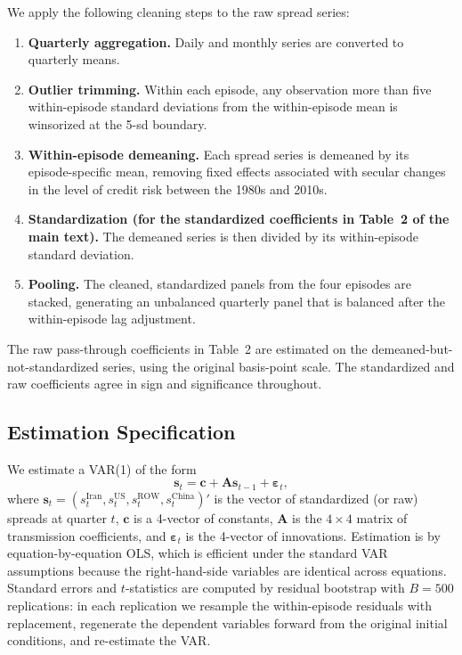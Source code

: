 \documentclass[12pt]{article}
\begin{document}
We apply the following cleaning steps to the raw spread series:
\begin{enumerate}[itemsep=2pt, topsep=2pt]
    \item \textbf{Quarterly aggregation.} Daily and monthly series are converted to quarterly means.
    \item \textbf{Outlier trimming.} Within each episode, any observation more than five within-episode standard deviations from the within-episode mean is winsorized at the 5-sd boundary.
    \item \textbf{Within-episode demeaning.} Each spread series is demeaned by its episode-specific mean, removing fixed effects associated with secular changes in the level of credit risk between the 1980s and 2010s.
    \item \textbf{Standardization (for the standardized coefficients in Table~2 of the main text).} The demeaned series is then divided by its within-episode standard deviation.
    \item \textbf{Pooling.} The cleaned, standardized panels from the four episodes are stacked, generating an unbalanced quarterly panel that is balanced after the within-episode lag adjustment.
\end{enumerate}
The raw pass-through coefficients in Table~2 are estimated on the demeaned-but-not-standardized series, using the original basis-point scale. The standardized and raw coefficients agree in sign and significance throughout.

\subsection{Estimation Specification}

We estimate a VAR(1) of the form
\begin{equation}
\mathbf{s}_t = \mathbf{c} + \mathbf{A} \mathbf{s}_{t-1} + \boldsymbol{\varepsilon}_t,
\end{equation}
where $\mathbf{s}_t = (s^{\text{Iran}}_t, s^{\text{US}}_t, s^{\text{ROW}}_t, s^{\text{China}}_t)'$ is the vector of standardized (or raw) spreads at quarter $t$, $\mathbf{c}$ is a 4-vector of constants, $\mathbf{A}$ is the $4 \times 4$ matrix of transmission coefficients, and $\boldsymbol{\varepsilon}_t$ is the 4-vector of innovations. Estimation is by equation-by-equation OLS, which is efficient under the standard VAR assumptions because the right-hand-side variables are identical across equations. Standard errors and $t$-statistics are computed by residual bootstrap with $B = 500$ replications: in each replication we resample the within-episode residuals with replacement, regenerate the dependent variables forward from the original initial conditions, and re-estimate the VAR.
\end{document}

